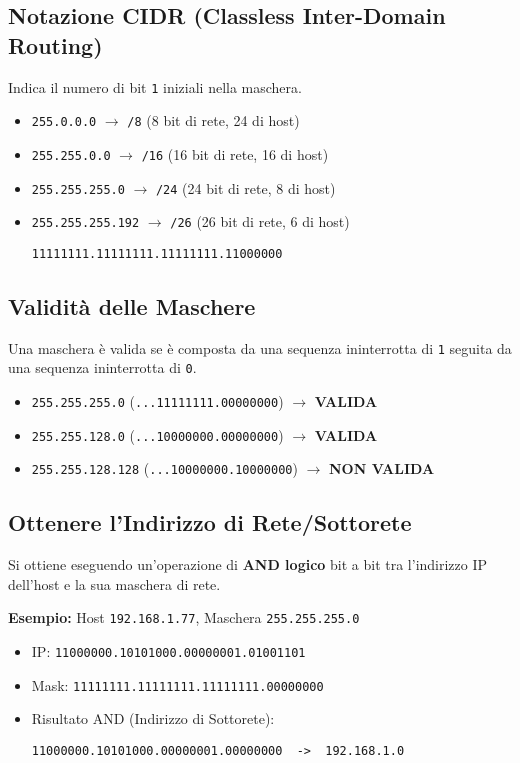 \subsection{Notazione CIDR (Classless Inter-Domain Routing)}
Indica il numero di bit \texttt{1} iniziali nella maschera.
\begin{itemize}
    \item \texttt{255.0.0.0} $\rightarrow$ \texttt{/8} (8 bit di rete, 24 di host)
    \item \texttt{255.255.0.0} $\rightarrow$ \texttt{/16} (16 bit di rete, 16 di host)
    \item \texttt{255.255.255.0} $\rightarrow$ \texttt{/24} (24 bit di rete, 8 di host)
    \item \texttt{255.255.255.192} $\rightarrow$ \texttt{/26} (26 bit di rete, 6 di host)
    \begin{verbatim}
11111111.11111111.11111111.11000000
    \end{verbatim}
\end{itemize}

\subsection{Validità delle Maschere}
Una maschera è valida se è composta da una sequenza ininterrotta di \texttt{1} seguita da una sequenza ininterrotta di \texttt{0}.
\begin{itemize}
    \item \texttt{255.255.255.0} (\texttt{...11111111.00000000}) $\rightarrow$ \textbf{VALIDA}
    \item \texttt{255.255.128.0} (\texttt{...10000000.00000000}) $\rightarrow$ \textbf{VALIDA}
    \item \texttt{255.255.128.128} (\texttt{...10000000.10000000}) $\rightarrow$ \textbf{NON VALIDA}
\end{itemize}

\subsection{Ottenere l'Indirizzo di Rete/Sottorete}
Si ottiene eseguendo un'operazione di \textbf{AND logico} bit a bit tra l'indirizzo IP dell'host e la sua maschera di rete.

\textbf{Esempio:} Host \texttt{192.168.1.77}, Maschera \texttt{255.255.255.0}
\begin{itemize}
    \item IP: \texttt{11000000.10101000.00000001.01001101}
    \item Mask: \texttt{11111111.11111111.11111111.00000000}
    \item Risultato AND (Indirizzo di Sottorete):
    \begin{verbatim}
11000000.10101000.00000001.00000000  ->  192.168.1.0
    \end{verbatim}
\end{itemize}

